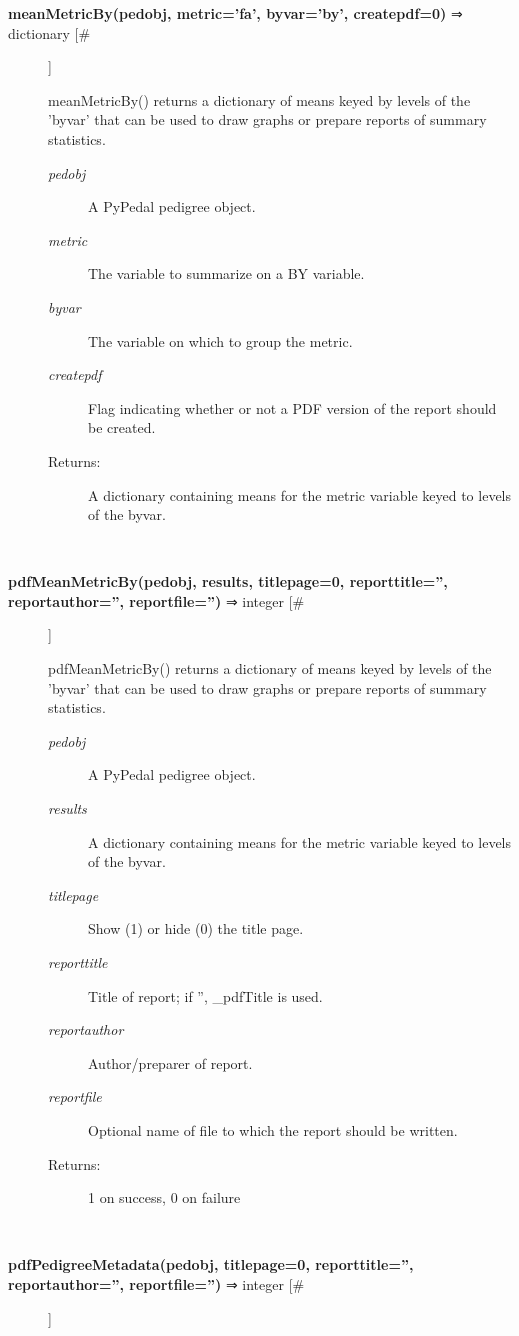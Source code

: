 \begin{description}
\item[\textbf{meanMetricBy(pedobj, metric='fa', byvar='by', createpdf=0)}
 ⇒ dictionary [\#]]

 meanMetricBy() returns a dictionary of means keyed by levels of the 'byvar' that can be used to draw graphs or prepare reports of summary statistics.
\begin{description}
\item[\emph{pedobj}
] A PyPedal pedigree object.
\item[\emph{metric}
] The variable to summarize on a BY variable.
\item[\emph{byvar}
] The variable on which to group the metric.
\item[\emph{createpdf}
] Flag indicating whether or not a PDF version of the report should be created.
\item[Returns:] A dictionary containing means for the metric variable keyed to levels of the byvar.

\end{description}
\\ 

\item[\textbf{pdfMeanMetricBy(pedobj, results, titlepage=0, reporttitle='', reportauthor='', reportfile='')}
 ⇒ integer [\#]]

 pdfMeanMetricBy() returns a dictionary of means keyed by levels of the 'byvar' that can be used to draw graphs or prepare reports of summary statistics.
\begin{description}
\item[\emph{pedobj}
] A PyPedal pedigree object.
\item[\emph{results}
] A dictionary containing means for the metric variable keyed to levels of the byvar.
\item[\emph{titlepage}
] Show (1) or hide (0) the title page.
\item[\emph{reporttitle}
] Title of report; if '', \_pdfTitle is used.
\item[\emph{reportauthor}
] Author/preparer of report.
\item[\emph{reportfile}
] Optional name of file to which the report should be written.
\item[Returns:] 1 on success, 0 on failure

\end{description}
\\ 

\item[\textbf{pdfPedigreeMetadata(pedobj, titlepage=0, reporttitle='', reportauthor='', reportfile='')}
 ⇒ integer [\#]]


\end{description}
